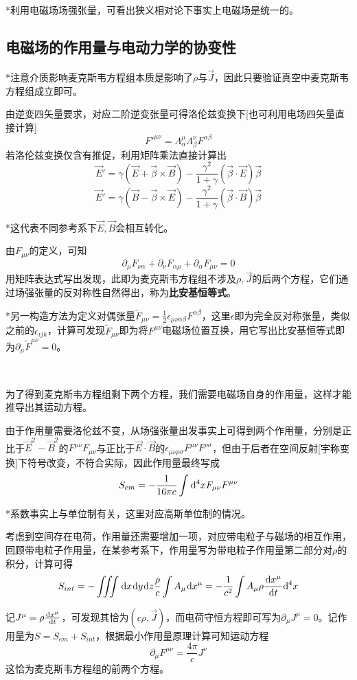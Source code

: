 \documentclass[a4paper,UTF8,fontset=windows]{ctexart}
\newcommand*{\dr}{\hspace{0.07em}\mathrm{d}}
\newcommand*{\vb}{\vec{B}}
\newcommand*{\ve}{\vec{E}}
\newcommand*{\vj}{\vec{J}}
\newcommand*{\vbeta}{\vec{\beta}}
\begin{document}
*利用电磁场场强张量，可看出狭义相对论下事实上电磁场是统一的。

\subsection{电磁场的作用量与电动力学的协变性}
*注意介质影响麦克斯韦方程组本质是影响了$\rho$与$\vj$，因此只要验证真空中麦克斯韦方程组成立即可。

由逆变四矢量要求，对应二阶逆变张量可得洛伦兹变换下[也可利用电场四矢量直接计算]
$${F'}^{\mu\nu}=\Lambda_\alpha^\mu\Lambda_\beta^\nu F^{\alpha\beta}$$
若洛伦兹变换仅含有推促，利用矩阵乘法直接计算出
$$\ve'=\gamma(\ve+\vbeta\times\vb)-\frac{\gamma^2}{1+\gamma}(\vbeta\cdot\ve)\vbeta$$
$$\ve'=\gamma(\vb-\vbeta\times\ve)-\frac{\gamma^2}{1+\gamma}(\vbeta\cdot\vb)\vbeta$$

*这代表不同参考系下$\ve,\vb$会相互转化。

由$F_{\mu\nu}$的定义，可知
$$\partial_\mu F_{\nu\alpha}+\partial_\nu F_{\alpha\mu}+\partial_\alpha F_{\mu\nu}=0$$
用矩阵表达式写出发现，此即为麦克斯韦方程组不涉及$\rho,\vj$的后两个方程，它们通过场强张量的反对称性自然得出，称为\textbf{比安基恒等式}。

*另一构造方法为定义对偶张量$\tilde{F}_{\mu\nu}=\frac{1}{2}\epsilon_{\mu\nu\alpha\beta}F^{\alpha\beta}$，这里$\epsilon$即为完全反对称张量，类似之前的$\epsilon_{ijk}$，计算可发现$\tilde{F}_{\mu\nu}$即为将$F^{\mu\nu}$电磁场位置互换，用它写出比安基恒等式即为$\partial_\mu\tilde{F}^{\mu\nu}=0$。

\

为了得到麦克斯韦方程组剩下两个方程，我们需要电磁场自身的作用量，这样才能推导出其运动方程。

由于作用量需要洛伦兹不变，从场强张量出发事实上可得到两个作用量，分别是正比于$\ve^2-\vb^2$的$F^{\mu\nu}F_{\mu\nu}$与正比于$\ve\cdot\vb$的$\epsilon_{\mu\nu\rho\sigma}F^{\mu\nu}F^{\rho\sigma}$，但由于后者在空间反射[宇称变换]下符号改变，不符合实际，因此作用量最终写成
$$S_{em}=-\frac{1}{16\pi c}\int\dr^4xF_{\mu\nu}F^{\mu\nu}$$

*系数事实上与单位制有关，这里对应高斯单位制的情况。

考虑到空间存在电荷，作用量还需要增加一项，对应带电粒子与磁场的相互作用，回顾带电粒子作用量，在某参考系下，作用量写为带电粒子作用量第二部分对$\rho$的积分，计算可得
$$S_{int}=-\iiint\dr x\dr y\dr z\frac{\rho}{c}\int A_\mu\dr x^\mu=-\frac{1}{c^2}\int A_\mu\rho\frac{\dr x^\mu}{\dr t}\dr^4x$$

记$J^\mu=\rho\frac{\dr x^\mu}{\dr t}$，可发现其恰为$(c\rho,\vj)$，而电荷守恒方程即可写为$\partial_\mu J^\mu=0$。记作用量为$S=S_{em}+S_{int}$，根据最小作用量原理计算可知运动方程
$$\partial_\mu F^{\mu\nu}=\frac{4\pi}{c}J^\nu$$
这恰为麦克斯韦方程组的前两个方程。
\end{document}
